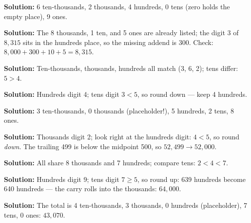 \documentclass[12pt]{article}
\begin{document}



\textbf{Solution:} 6 ten-thousands, 2 thousands, 4 hundreds, 0 tens (zero holds
the empty place), 9 ones. 


\textbf{Solution:} The 8 thousands, 1 ten, and 5 ones are already listed; the
digit 3 of $8{,}315$ sits in the hundreds place, so the missing addend is
$300$. Check: $8{,}000 + 300 + 10 + 5 = 8{,}315$. 


\textbf{Solution:} Ten-thousands, thousands, hundreds all match (3, 6, 2);
tens differ: $5 > 4$. 


\textbf{Solution:} Hundreds digit 4; tens digit $3 < 5$, so round down —
keep 4 hundreds. 


\textbf{Solution:} 3 ten-thousands, 0 thousands (placeholder!), 5 hundreds,
2 tens, 8 ones. 


\textbf{Solution:} Thousands digit 2; look right at the hundreds digit:
$4 < 5$, so round \emph{down}. The trailing 499 is below the midpoint 500, so
$52{,}499 \rightarrow 52{,}000$. 


\textbf{Solution:} All share 8 thousands and 7 hundreds; compare tens:
$2 < 4 < 7$. 


\textbf{Solution:} Hundreds digit 9; tens digit $7 \geq 5$, so round up: 639
hundreds become 640 hundreds — the carry rolls into the thousands:
$64{,}000$. 


\textbf{Solution:} The total is 4 ten-thousands, 3 thousands, 0 hundreds
(placeholder), 7 tens, 0 ones: $43{,}070$. 
\end{document}
